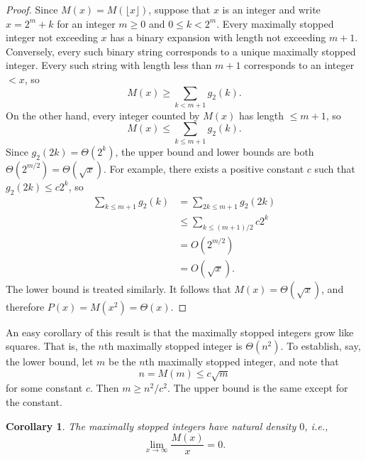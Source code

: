 \documentclass[12pt]{article}
\newtheorem{corollary}{Corollary}
\theoremstyle{definition}
\begin{document}
\begin{proof}
    Since $M(x) = M(\lfloor x \rfloor)$, suppose that $x$ is an integer and
    write $x = 2^m + k$ for an integer $m \geq 0$ and $0 \leq k < 2^m$. Every
    maximally stopped integer not exceeding $x$ has a binary expansion with
    length not exceeding $m + 1$. Conversely, every such binary string
    corresponds to a unique maximally stopped integer. Every such string with
    length less than $m + 1$ corresponds to an integer $< x$, so
    \begin{equation*}
        M(x) \geq \sum_{k < m + 1} g_2(k).
    \end{equation*}
    On the other hand, every integer counted by $M(x)$ has length $\leq m + 1$,
    so
    \begin{equation*}
        M(x) \leq \sum_{k \leq m + 1} g_2(k).
    \end{equation*}
    Since $g_2(2k) = \Theta(2^k)$, the upper bound and lower bounds are both
    $\Theta(2^{m / 2}) = \Theta(\sqrt{x})$. For example, there exists a
    positive constant $c$ such that $g_2(2k) \leq c 2^k$, so
    \begin{align*}
        \sum_{k \leq m + 1} g_2(k) &= \sum_{2k \leq m + 1} g_2(2k) \\
                                   &\leq \sum_{k \leq (m + 1) / 2} c 2^k \\
                                   &= O(2^{m / 2}) \\
                                   &= O(\sqrt{x}).
    \end{align*}
    The lower bound is treated similarly. It follows that $M(x) =
    \Theta(\sqrt{x})$, and therefore $P(x) = M(x^2) = \Theta(x)$.
\end{proof}

An easy corollary of this result is that the maximally stopped integers grow
like squares. That is, the $n$th maximally stopped integer is $\Theta(n^2)$. To
establish, say, the lower bound, let $m$ be the $n$th maximally stopped
integer, and note that
\begin{equation*}
    n = M(m) \leq c \sqrt{m}
\end{equation*}
for some constant $c$. Then $m \geq n^2 / c^2$. The upper bound is the same
except for the constant.

\begin{corollary}
    The maximally stopped integers have natural density $0$, i.e.,
    \begin{equation*}
        \lim_{x \to \infty} \frac{M(x)}{x} = 0.
    \end{equation*}
\end{corollary}
\end{document}
